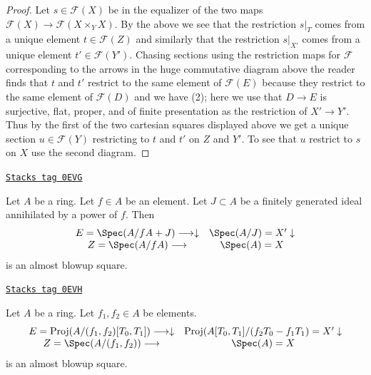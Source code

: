 \begin{proof}
\medskip\noindent
Let $s \in \mathcal{F}(X)$ be in the equalizer of the two maps
$\mathcal{F}(X) \to \mathcal{F}(X \times_Y X)$.
By the above we see that the restriction $s|_T$
comes from a unique element $t \in \mathcal{F}(Z)$
and similarly that the restriction $s|_{X'}$
comes from a unique element $t' \in \mathcal{F}(Y')$.
Chasing sections using the restriction maps for $\mathcal{F}$
corresponding to the arrows in the huge commutative diagram above
the reader finds that $t$ and $t'$ restrict to the same element of
$\mathcal{F}(E)$ because they restrict to the same element of
$\mathcal{F}(D)$ and we have (2); here we use that $D \to E$ is
surjective, flat, proper, and of finite presentation as the restriction
of $X' \to Y'$. Thus by the first of the two
cartesian squares displayed above we get a unique section
$u \in \mathcal{F}(Y)$
restricting to $t$ and $t'$ on $Z$ and $Y'$.
To see that $u$ restrict to $s$ on $X$ use the second diagram.
\end{proof}

\begin{example}
\label{flat-example-one-generator}
\href{https://stacks.math.columbia.edu/tag/0EVG}{\texttt{Stacks tag 0EVG}}

Let $A$ be a ring. Let $f \in A$ be an element. Let $J \subset A$
be a finitely generated ideal annihilated by a power of $f$.
Then
$$
\begin{array}{cc}E = \Spec(A/fA + J) \longrightarrow\downarrow & \Spec(A/J) = X' \downarrow \\ Z = \Spec(A/fA) \longrightarrow & \Spec(A) = X\end{array}
$$
is an almost blowup square.
\end{example}

\begin{example}
\label{flat-example-two-generators}
\href{https://stacks.math.columbia.edu/tag/0EVH}{\texttt{Stacks tag 0EVH}}

Let $A$ be a ring. Let $f_1, f_2 \in A$ be elements.
$$
\begin{array}{cc}E = \text{Proj}(A/(f_1, f_2)[T_0, T_1]) \longrightarrow\downarrow & \text{Proj}(A[T_0, T_1]/(f_2 T_0 - f_1 T_1) = X' \downarrow \\ Z = \Spec(A/(f_1, f_2)) \longrightarrow & \Spec(A) = X\end{array}
$$
is an almost blowup square.
\end{example}

